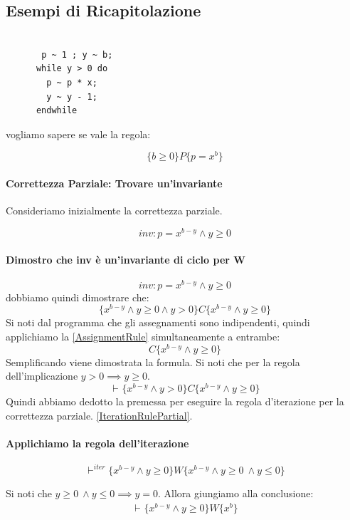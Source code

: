 				      				\subsection{Esempi di Ricapitolazione}
				      				\begin{esempio}
				      					\begin{lstlisting}
	
	   p ~ 1 ; y ~ b; 
      while y > 0 do
        p ~ p * x;
        y ~ y - 1;
      endwhile      						\end{lstlisting}
				      vogliamo sapere se vale la regola:
				      
				      \[\{b \geq 0\}P\{p = x^b\}\] 
				      
				      \paragraph{Correttezza Parziale: Trovare un'invariante}
				      Consideriamo inizialmente la correttezza parziale.
				     
				      \[inv: p = x^{b-y} \land y \geq 0\]
				      \paragraph{Dimostro che inv è un'invariante di ciclo per W}
				      
				      \[inv: p = x^{b-y} \land y \geq 0\]
				      dobbiamo quindi dimostrare che:
				      \[\{x^{b-y} \land y \geq 0 \land y > 0\}C\{x^{b-y} \land y \geq 0\}\] 
				      Si noti dal programma che gli assegnamenti sono indipendenti, quindi applichiamo la \ref{AssignmentRule} simultaneamente a entrambe:
				      \[C\{x^{b-y} \land y \geq 0\}\] 
				      Semplificando viene dimostrata la formula. Si noti che per la regola dell'implicazione $y > 0 \implies y \geq 0$.
				      \[\vdash^{}\{x^{b-y} \land y > 0 \}C\{x^{b-y} \land y \geq 0\}\]
				      Quindi abbiamo dedotto la premessa per eseguire la regola d'iterazione per la correttezza parziale. \ref{IterationRulePartial}.
				      \paragraph{Applichiamo la regola dell'iterazione}
            
  				      \[\vdash^{iter}\{x^{b-y} \land y \geq 0 \}W\{x^{b-y} \land y \geq 0\ \land y \leq 0\}\]
  				       
				      Si noti che $ y \geq 0\ \land y \leq 0 \implies y = 0$. Allora giungiamo alla conclusione:
				       				        \begin{align}
  				       \vdash^{}\{x^{b-y} \land y \geq 0 \}W\{x^b\}
      				        \label{Example1}
 				        \end{align}


\end{esempio}
